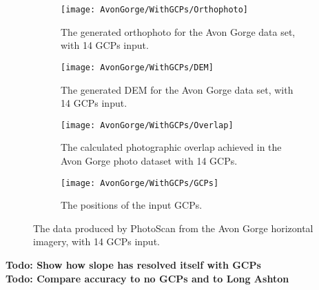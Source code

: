 \begin{figure}
    \centering
    \begin{subfigure}[b]{0.45\textwidth}
        \texttt{[image: AvonGorge/WithGCPs/Orthophoto]}
        \caption{The generated orthophoto for the Avon Gorge data set, with 14
        GCPs input.}
        \label{img:avon-gorge/with-gcps/orthophoto}
    \end{subfigure}
    \begin{subfigure}[b]{0.45\textwidth}
        \texttt{[image: AvonGorge/WithGCPs/DEM]}
        \caption{The generated DEM for the Avon Gorge data set, with 14 GCPs
        input.}
        \label{img:avon-gorge/with-gcps/dem}
    \end{subfigure}
    \begin{subfigure}[b]{0.45\textwidth}
        \texttt{[image: AvonGorge/WithGCPs/Overlap]}
        \caption{The calculated photographic overlap achieved in the Avon Gorge
        photo dataset with 14 GCPs.}
        \label{img:avon-gorge/with-gcps/overlap}
    \end{subfigure}
    \begin{subfigure}[b]{0.45\textwidth}
        \texttt{[image: AvonGorge/WithGCPs/GCPs]}
        \caption{The positions of the input GCPs.}
        \label{img:avon-gorge/with-gcps/gcps}
    \end{subfigure}
    \caption{The data produced by PhotoScan from the Avon Gorge horizontal
    imagery, with 14 GCPs input.}
    \label{img:avon-gorge/with-gcps}
\end{figure}

\textbf{Todo: Show how slope has resolved itself with GCPs} \\
\textbf{Todo: Compare accuracy to no GCPs and to Long Ashton} \\
